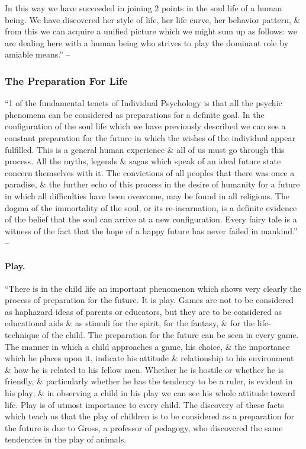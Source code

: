 \documentclass{article}
\begin{document}
In this way we have succeeded in joining 2 points in the soul life of a human being. We have discovered her style of life, her life curve, her behavior pattern, \& from this we can acquire a unified picture which we might sum up as follows: we are dealing here with a human being who strives to play the dominant role by amiable means.'' -- \cite[pp. 80--90]{Adler_human_nature}

\subsubsection{The Preparation For Life}
``1 of the fundamental tenets of Individual Psychology is that all the psychic phenomena can be considered as preparations for a definite goal. In the configuration of the soul life which we have previously described we can see a constant preparation for the future in which the wishes of the individual appear fulfilled. This is a general human experience \& all of us must go through this process. All the myths, legends \& sagas which speak of an ideal future state concern themselves with it. The convictions of all peoples that there was once a paradise, \& the further echo of this process in the desire of humanity for a future in which all difficulties have been overcome, may be found in all religions. The dogma of the immortality of the soul, or its re-incarnation, is a definite evidence of the belief that the soul can arrive at a new configuration. Every fairy tale is a witness of the fact that the hope of a happy future has never failed in mankind.'' -- \cite[p. 91]{Adler_human_nature}

\paragraph{Play.} ``There is in the child life an important phenomenon which shows very clearly the process of preparation for the future. It is play. Games are not to be considered as haphazard ideas of parents or educators, but they are to be considered as educational aids \& as stimuli for the spirit, for the fantasy, \& for the life-technique of the child. The preparation for the future can be seen in every game. The manner in which a child approaches a game, his choice, \& the importance which he places upon it, indicate his attitude \& relationship to his environment \& how he is related to his fellow men. Whether he is hostile or whether he is friendly, \& particularly whether he has the tendency to be a ruler, is evident in his play; \& in observing a child in his play we can see his whole attitude toward life. Play is of utmost importance to every child. The discovery of these facts which teach us that the play of children is to be considered as a preparation for the future is due to Gross, a professor of pedagogy, who discovered the same tendencies in the play of animals.
\end{document}
